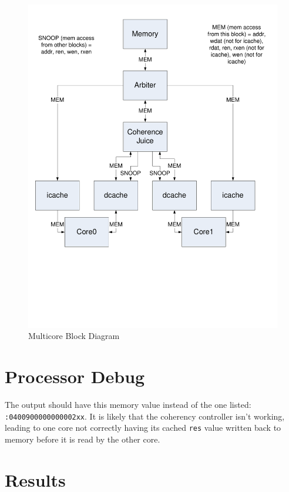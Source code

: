 \documentclass[12pt]{article}
\begin{document}
\begin{figure}
	\begin{center}
		\includegraphics[width=7in]{multicore}
	\end{center}
	\caption{Multicore Block Diagram}
	\label{fig:dcache}
\end{figure}

\newpage

\newpage
\section{Processor Debug}

The output should have this memory value instead of the one listed: \texttt{:0400900000000002xx}. It is likely that the coherency controller isn't working, leading to one core not correctly having its cached \texttt{res} value written back to memory before it is read by the other core.\\


\newpage
  \section{Results}
  
\end{document}
